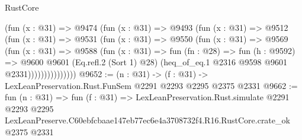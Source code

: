 \begin{lexlean}{RustCore}
\begin{coremodule}
                (fun (x : @31) =>
                @9474
                  (fun (x : @31) =>
                  @9493
                    (fun (x : @31) =>
                    @9512
                      (fun (x : @31) =>
                      @9531
                        (fun (x : @31) =>
                        @9550
                          (fun (x : @31) =>
                          @9569
                            (fun (x : @31) =>
                            @9588
                              (fun (x : @31) =>
                              fun (fn : @28) =>
                              fun (h : @9592) =>
                              @9600
                                @9601
                                (Eq.refl.{2} (Sort 1) @28)
                                (heq_of_eq.{1} @2316 @9598 @9601 @2331)))))))))))))))
@9652 := (n : @31) -> (f : @31) -> LexLeanPreservation.Rust.FunSem @2291 @2293 @2295 @2375 @2331
@9662 := fun (n : @31) =>
  fun (f : @31) =>
  LexLeanPreservation.Rust.simulate
    @2291
    @2293
    @2295
    LexLeanPreserve.C60ebfcbaae147eb77ec6e4a3708732f4.R16.RustCore.crate_ok
    @2375
    @2331
\end{coremodule}
\end{lexlean}
